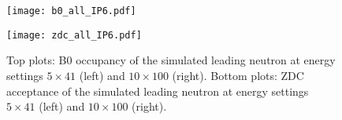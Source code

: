 \begin{figure}
  \centering
  \begin{minipage}[b]{0.48\linewidth}
    \texttt{[image: b0\_all\_IP6.pdf]}
  \end{minipage}
  \begin{minipage}[b]{0.48\linewidth}
    \texttt{[image: zdc\_all\_IP6.pdf]}
  \end{minipage}
  
  \caption{Top plots: B0 occupancy of the simulated leading neutron at energy settings $5\times41$ (left) and $10\times100$ (right). Bottom plots: ZDC acceptance of the simulated leading neutron at energy settings $5\times41$ (left) and $10\times100$ (right).}
  \label{fig:b0_zdc_all}
\end{figure}

